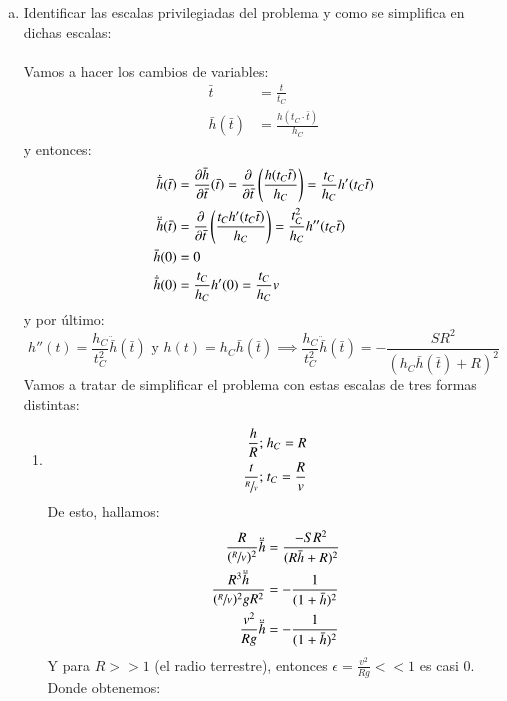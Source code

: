 \begin{ex}[H1.4]
\begin{enumerate}[a)]
        \item Identificar las escalas privilegiadas del problema y como se simplifica en dichas escalas:\\\\
        Vamos a hacer los cambios de variables:
        \begin{align*}
            \bar{t} &= \frac{t}{t_C}\\
            \bar h (\bar t) &= \frac{h(t_C \cdot \bar t)}{h_C}
        \end{align*}
        y entonces:
        \begin{align*}
            \dot{\bar h}(\bar t) &= \frac{\partial \bar h}{\partial \bar t}(\bar t) = \frac{\partial}{\partial \bar t}\left(\frac{h(t_C\bar t)}{h_C}\right) = \frac{t_C}{h_C} h'(t_C \bar t)\\
            \ddot{\bar h}(\bar t) &= \frac{\partial}{\partial \bar t}\left(\frac{t_C h'(t_C \bar t)}{h_C}\right) = \frac{t_C^2}{h_C} h''(t_C \bar t)\\
            \bar h (0) &= 0\\
            \dot{\bar h}(0) &= \frac{t_C}{h_C} h'(0) = \frac{t_C}{h_C} v\\
        \end{align*}
        y por último:
        $$
            h''(t) = \frac{h_C}{t_C^2} \ddot{\bar h}(\bar t) \text { y } h(t) = h_C \bar h (\bar t) \implies \frac{h_C}{t_C^2}\ddot{\bar h}(\bar t) = - \frac{SR^2}{(h_C \bar h(\bar t) + R)^2}
        $$
        Vamos a tratar de simplificar el problema con estas escalas de tres formas distintas:
        \begin{enumerate}[(1)]
            \item
            \begin{align*}
                \frac{h}{R};&\ h_C = R\\
                \frac{t}{\sfrac{R}{v}};&\ t_C = \frac{R}{v}
            \end{align*}
            De esto, hallamos:
            \begin{align*}
                \frac{R}{(\sfrac{R}{V})^2} \ddot{\bar h} &= \frac{-SR^2}{(R\bar h + R)^2}\\
                \frac{R^3 \ddot{\bar h}}{ (\sfrac{R}{V})^2 g R^2 } &= -\frac{1}{(1+\bar h)^2}\\
                \frac{v^2}{Rg} \ddot{\bar{h}} &= -\frac{1}{(1+\bar h)^2}
            \end{align*}
            Y para $R >> 1$ (el radio terrestre), entonces $\epsilon = \frac{v^2}{Rg} << 1$ es casi $0$. Donde obtenemos:

\end{enumerate}
\end{enumerate}
\end{ex}
